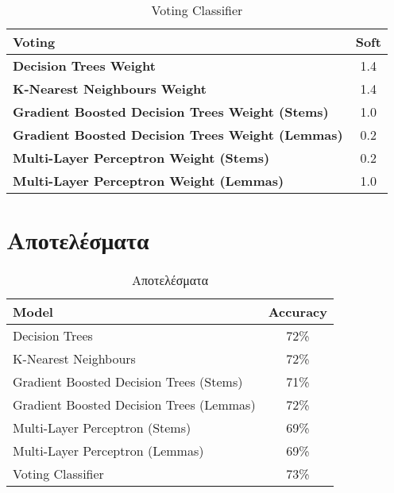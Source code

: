 \documentclass[a4paper, 12pt]{article}
\begin{document}
\begin{table}[h!]
  \caption{Voting Classifier}
  \begin{center}
	\begin{tabular}{l c}
	  \hline
	  \textbf{Voting} & Soft \\
	  \hline
	  \textbf{Decision Trees Weight} & 1.4 \\
	  \hline
	  \textbf{K-Nearest Neighbours Weight} & 1.4 \\
	  \hline
	  \textbf{Gradient Boosted Decision Trees Weight (Stems)} & 1.0 \\
	  \hline
	  \textbf{Gradient Boosted Decision Trees Weight (Lemmas)} & 0.2 \\
	  \hline
	  \textbf{Multi-Layer Perceptron Weight (Stems)} & 0.2 \\
	  \hline
	  \textbf{Multi-Layer Perceptron Weight (Lemmas)} & 1.0 \\
	  \hline
	\end{tabular}
  \end{center}
\end{table}

\section{Αποτελέσματα}


\begin{table}[h!]
  \caption{Αποτελέσματα}
  \begin{center}
	\begin{tabular}{l c}
	  \hline
	  \textbf{Model} & Accuracy \\
	  \hline
	  Decision Trees & 72\% \\
	  \hline
	  K-Nearest Neighbours & 72\% \\
	  \hline
	  Gradient Boosted Decision Trees (Stems) & 71\% \\
	  \hline
	  Gradient Boosted Decision Trees (Lemmas) & 72\% \\
	  \hline
	  Multi-Layer Perceptron (Stems) & 69\% \\
	  \hline
	  Multi-Layer Perceptron (Lemmas) & 69\% \\
	  \hline
	  Voting Classifier & 73\% \\
	  \hline
	\end{tabular}
  \end{center}
\end{table}
\end{document}
